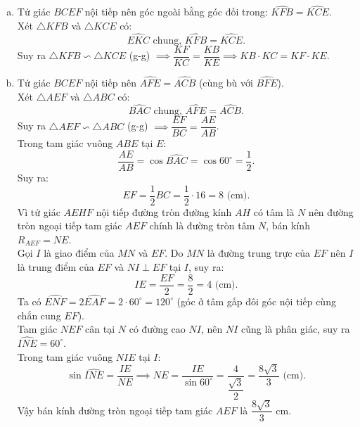 \begin{bt}
{\begin{enumerate}[a)]
    Vì $M$ là trung điểm của $BC$ nên $M$ là tâm đường tròn ngoại tiếp tứ giác $BCEF$, do đó $ME = MF = \dfrac{BC}{2}$.\\
    Xét tứ giác $AEHF$ có $\widehat{AEH} + \widehat{AFH} = 90^\circ + 90^\circ = 180^\circ$ nên nội tiếp đường tròn đường kính $AH$.\\
    Vì $N$ là trung điểm của $AH$ nên $N$ là tâm đường tròn ngoại tiếp tứ giác $AEHF$, do đó $NE = NF = \dfrac{AH}{2}$.\\
    Vì $ME = MF$ và $NE = NF$ nên $MN$ là đường trung trực của đoạn thẳng $EF$. Do đó $MN \perp EF$.
    \item Tứ giác $BCEF$ nội tiếp nên góc ngoài bằng góc đối trong: $\widehat{KFB} = \widehat{KCE}$.\\
    Xét $\triangle KFB$ và $\triangle KCE$ có:
    $$\widehat{EKC}\text{ chung, } \widehat{KFB} = \widehat{KCE}.$$
    Suy ra $\triangle KFB \backsim \triangle KCE$ (g-g) $\implies \dfrac{KF}{KC} = \dfrac{KB}{KE} \implies KB \cdot KC = KF \cdot KE$.
    \item Tứ giác $BCEF$ nội tiếp nên $\widehat{AFE} = \widehat{ACB}$ (cùng bù với $\widehat{BFE}$).\\
    Xét $\triangle AEF$ và $\triangle ABC$ có:
    $$\widehat{BAC}\text{ chung, } \widehat{AFE} = \widehat{ACB}.$$
    Suy ra $\triangle AEF \backsim \triangle ABC$ (g-g) $\implies \dfrac{EF}{BC} = \dfrac{AE}{AB}$.\\
    Trong tam giác vuông $ABE$ tại $E$:
    $$\dfrac{AE}{AB} = \cos \widehat{BAC} = \cos 60^\circ = \dfrac{1}{2}.$$
    Suy ra:
    $$EF = \dfrac{1}{2}BC = \dfrac{1}{2} \cdot 16 = 8\text{ (cm)}.$$
    Vì tứ giác $AEHF$ nội tiếp đường tròn đường kính $AH$ có tâm là $N$ nên đường tròn ngoại tiếp tam giác $AEF$ chính là đường tròn tâm $N$, bán kính $R_{AEF} = NE$.\\
    Gọi $I$ là giao điểm của $MN$ và $EF$. Do $MN$ là đường trung trực của $EF$ nên $I$ là trung điểm của $EF$ và $NI \perp EF$ tại $I$, suy ra:
    $$IE = \dfrac{EF}{2} = \dfrac{8}{2} = 4\text{ (cm)}.$$
    Ta có $\widehat{ENF} = 2\widehat{EAF} = 2 \cdot 60^\circ = 120^\circ$ (góc ở tâm gấp đôi góc nội tiếp cùng chắn cung $EF$).\\
    Tam giác $NEF$ cân tại $N$ có đường cao $NI$, nên $NI$ cũng là phân giác, suy ra $\widehat{INE} = 60^\circ$.\\
    Trong tam giác vuông $NIE$ tại $I$:
    $$\sin \widehat{INE} = \dfrac{IE}{NE} \implies NE = \dfrac{IE}{\sin 60^\circ} = \dfrac{4}{\dfrac{\sqrt{3}}{2}} = \dfrac{8\sqrt{3}}{3}\text{ (cm)}.$$
    Vậy bán kính đường tròn ngoại tiếp tam giác $AEF$ là $\dfrac{8\sqrt{3}}{3}\text{ cm}$.
\end{enumerate}
}
\end{bt}
